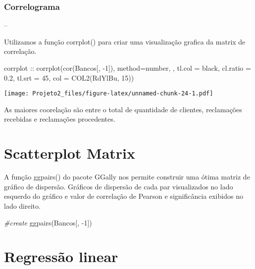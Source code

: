 \documentclass[
]{article}
\newenvironment{Shaded}{\begin{snugshade}}{\end{snugshade}}
\newcommand{\AttributeTok}[1]{\textcolor[rgb]{0.77,0.63,0.00}{#1}}
\newcommand{\CommentTok}[1]{\textcolor[rgb]{0.56,0.35,0.01}{\textit{#1}}}
\newcommand{\DecValTok}[1]{\textcolor[rgb]{0.00,0.00,0.81}{#1}}
\newcommand{\FloatTok}[1]{\textcolor[rgb]{0.00,0.00,0.81}{#1}}
\newcommand{\FunctionTok}[1]{\textcolor[rgb]{0.00,0.00,0.00}{#1}}
\newcommand{\NormalTok}[1]{#1}
\newcommand{\SpecialCharTok}[1]{\textcolor[rgb]{0.00,0.00,0.00}{#1}}
\newcommand{\StringTok}[1]{\textcolor[rgb]{0.31,0.60,0.02}{#1}}
\begin{document}
\hypertarget{correlograma}{%
\subsubsection{Correlograma}\label{correlograma}}

--

Utilizamos a função corrplot() para criar uma visualização grafica da
matrix de correlação.

\begin{Shaded}
\begin{Highlighting}[]
\NormalTok{corrplot }\SpecialCharTok{::} \FunctionTok{corrplot}\NormalTok{(}\FunctionTok{cor}\NormalTok{(Bancos[, }\SpecialCharTok{{-}}\DecValTok{1}\NormalTok{]), }\AttributeTok{method=}\StringTok{\textquotesingle{}number\textquotesingle{}}\NormalTok{, , }\AttributeTok{tl.col =} \StringTok{\textquotesingle{}black\textquotesingle{}}\NormalTok{, }\AttributeTok{cl.ratio =} \FloatTok{0.2}\NormalTok{, }\AttributeTok{tl.srt =} \DecValTok{45}\NormalTok{, }\AttributeTok{col =} \FunctionTok{COL2}\NormalTok{(}\StringTok{\textquotesingle{}RdYlBu\textquotesingle{}}\NormalTok{, }\DecValTok{15}\NormalTok{))}
\end{Highlighting}
\end{Shaded}

\texttt{[image: Projeto2\_files/figure-latex/unnamed-chunk-24-1.pdf]}

As maiores coorelação são entre o total de quantidade de clientes,
reclamações recebidas e reclamações procedentes.

\hypertarget{scatterplot-matrix}{%
\section{Scatterplot Matrix}\label{scatterplot-matrix}}

A função ggpairs() do pacote GGally nos permite construir uma ótima
matriz de gráfico de dispersão. Gráficos de dispersão de cada par
visualizados no lado esquerdo do gráfico e valor de correlação de
Pearson e significância exibidos no lado direito.

\begin{Shaded}
\begin{Highlighting}[]
\CommentTok{\#create }
\FunctionTok{ggpairs}\NormalTok{(Bancos[, }\SpecialCharTok{{-}}\DecValTok{1}\NormalTok{])}
\end{Highlighting}
\end{Shaded}

\hypertarget{regressuxe3o-linear}{%
\section{Regressão linear}\label{regressuxe3o-linear}}
\end{document}
